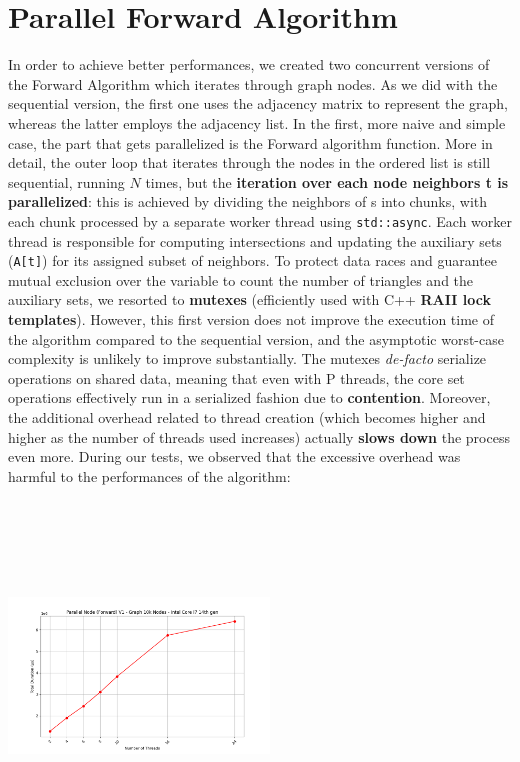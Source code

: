 \documentclass{aes2e}
\begin{document}
\section{Parallel Forward Algorithm}
In order to achieve better performances, we created two concurrent versions of the Forward Algorithm which iterates through graph nodes. As we did with the sequential version, the first one uses the adjacency matrix to represent the graph, whereas the latter employs the adjacency list. In the first, more naive and simple case, the part that gets parallelized is the Forward algorithm function. More in detail, the outer loop that iterates through the nodes in the ordered list is still sequential, running $N$ times, but the \textbf{iteration over each node neighbors t is parallelized}: this is achieved by dividing the neighbors of s into chunks, with each chunk processed by a separate worker thread using \texttt{std::async}. Each worker thread is responsible for computing intersections and updating the auxiliary sets (\texttt{A[t]}) for its assigned subset of neighbors. To protect data races and guarantee mutual exclusion over the variable to count the number of triangles and the auxiliary sets, we resorted to \textbf{mutexes} (efficiently used with C++ \textbf{RAII lock templates}). However, this first version does not improve the execution time of the algorithm compared to the sequential version, and the asymptotic worst-case complexity is unlikely to improve substantially. The mutexes \textit{de-facto} serialize operations on shared data, meaning that even with P threads, the core set operations effectively run in a serialized fashion due to \textbf{contention}. Moreover, the additional overhead related to thread creation (which becomes higher and higher as the number of threads used increases) actually \textbf{slows down} the process even more. During our tests, we observed that the excessive overhead was harmful to the performances of the algorithm:
\includegraphics[width=0.52\textwidth, height=10cm, keepaspectratio]{charts/Parallel Node (Forward) V1 - Graph 10k Nodes - Intel Core i7 14th gen.png}
\end{document}
